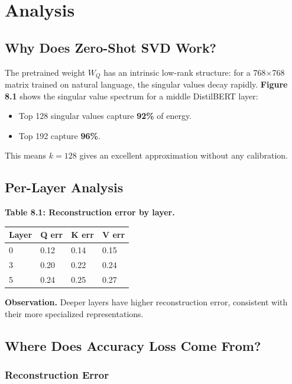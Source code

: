 \section{Analysis}

\subsection{Why Does Zero-Shot SVD Work?}

The pretrained weight $W_Q$ has an intrinsic low-rank structure: for a 
768$\times$768 matrix trained on natural language, the singular values decay 
rapidly. \textbf{Figure 8.1} shows the singular value spectrum for a middle 
DistilBERT layer:

\begin{itemize}
\item Top 128 singular values capture \textbf{92\%} of energy.
\item Top 192 capture \textbf{96\%}.

\end{itemize}
This means $k = 128$ gives an excellent approximation without any 
calibration.

\subsection{Per-Layer Analysis}

\textbf{Table 8.1: Reconstruction error by layer.}

\begin{table}[H]
\centering
\small
\begin{tabular}{llll}
\toprule
\textbf{Layer} & \textbf{Q err} & \textbf{K err} & \textbf{V err} \\
\midrule
0 & 0.12 & 0.14 & 0.15 \\
3 & 0.20 & 0.22 & 0.24 \\
5 & 0.24 & 0.25 & 0.27 \\
\bottomrule
\end{tabular}
\end{table}

\textbf{Observation.} Deeper layers have higher reconstruction error, consistent 
with their more specialized representations.

\subsection{Where Does Accuracy Loss Come From?}

\subsubsection{Reconstruction Error}

